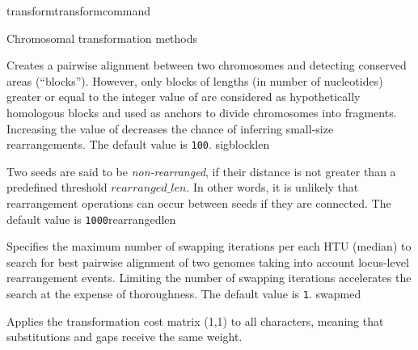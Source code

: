 \begin{command}{transform}{transformcommand}
\begin{arguments}
\begin{argumentgroup}{Chromosomal transformation methods}
\begin{description}
                        {Creates a pairwise alignment between two chromosomes and
                          detecting conserved areas (``blocks''). However, only blocks of
                          lengths (in number of nucleotides) greater or equal to the integer
                          value of  are considered as hypothetically
                        homologous blocks and used as anchors to divide chromosomes into
                        fragments. Increasing the value of  decreases
                        the chance of inferring small-size rearrangements. The default value is \texttt{100}.} 
                        {sigblocklen}

           	 {Two seeds are said to be \emph{non-rearranged}, 
              	if their distance is not greater than  a predefined 
              	threshold $rearranged\_len$. In other words, it is unlikely that rearrangement 
              	operations can occur between seeds if they are connected.
             	 The default value is \texttt{1000}}{rearrangedlen} 



                        {Specifies the maximum number of swapping iterations
                        per each HTU (median) to search for best pairwise
                        alignment of two genomes taking into account locus-level
                        rearrangement events. Limiting the number of swapping
                        iterations accelerates the search at the expense of
                        thoroughness. The default value is \texttt{1}.}
                        {swapmed}

            \end{description}	

	\end{argumentgroup}
	\end{arguments}
	

	\begin{poyexamples} 
            {Applies the transformation cost matrix (1,1) to all characters,
            meaning that substitutions and gaps receive the same weight.}


\end{poyexamples}
\end{command}
